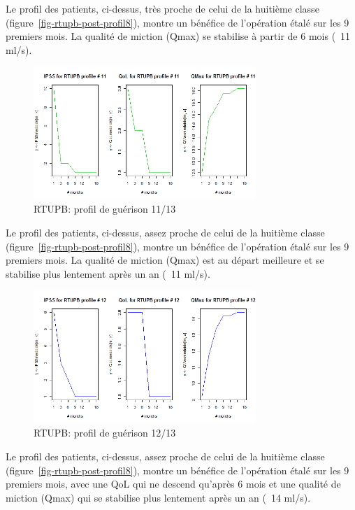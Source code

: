Le profil des patients, ci-dessus, très proche de celui de la huitième classe (figure~\ref{fig-rtupb-post-profil8}), montre un bénéfice de l'opération étalé sur les 9 premiers mois. La qualité de miction (Qmax) se stabilise à partir de 6 mois (~11 ml/s).

\begin{figure}[H]
\centering
\includegraphics[width=0.75\textwidth]{../Fig/RTUPB/rtupb-profil-post-11.png}
\caption[]{RTUPB: profil de guérison 11/13}
\label{fig-rtupb-post-profil11}
\end{figure}

Le profil des patients, ci-dessus, assez proche de celui de la huitième classe (figure~\ref{fig-rtupb-post-profil8}), montre un bénéfice de l'opération étalé sur les 9 premiers mois. La qualité de miction (Qmax) est au départ meilleure et se stabilise plus lentement après un an (~11 ml/s).

\begin{figure}[H]
\centering
\includegraphics[width=0.75\textwidth]{../Fig/RTUPB/rtupb-profil-post-12.png}
\caption[]{RTUPB: profil de guérison 12/13}
\label{fig-rtupb-post-profil12}
\end{figure}

Le profil des patients, ci-dessus, assez proche de celui de la huitième classe (figure~\ref{fig-rtupb-post-profil8}), montre un bénéfice de l'opération étalé sur les 9 premiers mois, avec une QoL qui ne descend qu'après 6 mois et une qualité de miction (Qmax) qui se stabilise plus lentement après un an (~14 ml/s).

